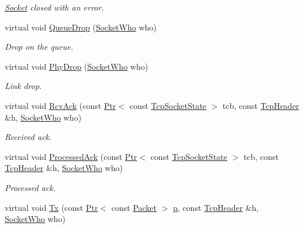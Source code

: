\begin{DoxyCompactItemize}
\begin{DoxyCompactList}\small\item\em \hyperlink{classns3_1_1Socket}{Socket} closed with an error. \end{DoxyCompactList}\item 
virtual void \hyperlink{classns3_1_1TcpGeneralTest_a78442dd60bad29a24a82a819e7e13d2d}{Queue\+Drop} (\hyperlink{classns3_1_1TcpGeneralTest_a29338e6b7137cad650c2ff835713f6ee}{Socket\+Who} who)
\begin{DoxyCompactList}\small\item\em Drop on the queue. \end{DoxyCompactList}\item 
virtual void \hyperlink{classns3_1_1TcpGeneralTest_acf4bcdc3ed9e607baa6e71a22f8b2127}{Phy\+Drop} (\hyperlink{classns3_1_1TcpGeneralTest_a29338e6b7137cad650c2ff835713f6ee}{Socket\+Who} who)
\begin{DoxyCompactList}\small\item\em Link drop. \end{DoxyCompactList}\item 
virtual void \hyperlink{classns3_1_1TcpGeneralTest_a3cea13990a8e0032cf2abe25f2409092}{Rcv\+Ack} (const \hyperlink{classns3_1_1Ptr}{Ptr}$<$ const \hyperlink{classns3_1_1TcpSocketState}{Tcp\+Socket\+State} $>$ tcb, const \hyperlink{classns3_1_1TcpHeader}{Tcp\+Header} \&h, \hyperlink{classns3_1_1TcpGeneralTest_a29338e6b7137cad650c2ff835713f6ee}{Socket\+Who} who)
\begin{DoxyCompactList}\small\item\em Received ack. \end{DoxyCompactList}\item 
virtual void \hyperlink{classns3_1_1TcpGeneralTest_aaf6040114684686637a68e26a736f63d}{Processed\+Ack} (const \hyperlink{classns3_1_1Ptr}{Ptr}$<$ const \hyperlink{classns3_1_1TcpSocketState}{Tcp\+Socket\+State} $>$ tcb, const \hyperlink{classns3_1_1TcpHeader}{Tcp\+Header} \&h, \hyperlink{classns3_1_1TcpGeneralTest_a29338e6b7137cad650c2ff835713f6ee}{Socket\+Who} who)
\begin{DoxyCompactList}\small\item\em Processed ack. \end{DoxyCompactList}\item 
virtual void \hyperlink{classns3_1_1TcpGeneralTest_ae3ae1d4a08bd0337cf66ef34d4771d89}{Tx} (const \hyperlink{classns3_1_1Ptr}{Ptr}$<$ const \hyperlink{classns3_1_1Packet}{Packet} $>$ \hyperlink{lte__link__budget__x2__handover__measures_8m_ac9de518908a968428863f829398a4e62}{p}, const \hyperlink{classns3_1_1TcpHeader}{Tcp\+Header} \&h, \hyperlink{classns3_1_1TcpGeneralTest_a29338e6b7137cad650c2ff835713f6ee}{Socket\+Who} who)

\end{DoxyCompactItemize}
